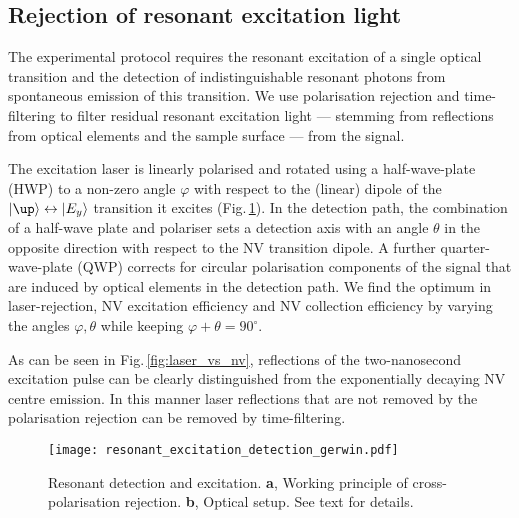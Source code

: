 \subsection{Rejection of resonant excitation light}
The experimental protocol requires the resonant excitation of a single optical transition and the detection of indistinguishable resonant photons from spontaneous emission of this transition. We use polarisation rejection and time-filtering to filter residual resonant excitation light --- stemming from reflections from optical elements and the sample surface --- from the signal.

The excitation laser is linearly polarised and rotated using a half-wave-plate (HWP) to a non-zero angle $\varphi$  with respect to the (linear) dipole of the $\ket{\up}\leftrightarrow\ket{E_y}$ transition it excites (Fig.\,\ref{fig:resonant_detection}). In the detection path, the combination of a half-wave plate and polariser sets a detection axis with an angle $\theta$ in the opposite direction with respect to the NV transition dipole. A further quarter-wave-plate (QWP) corrects for circular polarisation components of the signal that are induced by optical elements in the detection path.  We find the optimum in laser-rejection, NV excitation efficiency and NV collection efficiency by varying the angles $\varphi,\theta$ while keeping $\varphi + \theta = 90^\circ$.

As can be seen in Fig.\,\ref{fig:laser_vs_nv}, reflections of the two-nanosecond excitation pulse can be clearly distinguished from the exponentially decaying NV centre emission. In this manner laser reflections that are not removed by the polarisation rejection can be removed by time-filtering. %
\begin{figure}[h]
\centering
\texttt{[image: resonant\_excitation\_detection\_gerwin.pdf]}
\caption{Resonant detection and excitation. \textbf{a}, Working principle of cross-polarisation rejection. \textbf{b}, Optical setup. See text for details.}
\label{fig:resonant_detection}
\end{figure}

